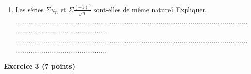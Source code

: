 \documentclass{article}
\begin{document}
\begin{footnotesize}
\begin{enumerate}
    ...........................................................................................................................................................................\newline\newline
    \item Les séries $\Sigma u_{n}$ et $\Sigma \frac{(-1)^{n}}{\sqrt{n}}$ sont-elles de même nature? Expliquer.\newline\newline
    ...........................................................................................................................................................................\newline
    ...........................................................................................................................................................................\newline\newline
\end{enumerate}\newpage
\end{footnotesize}
\noindent\textbf{Exercice 3 (7 points)}\newline
\end{document}
